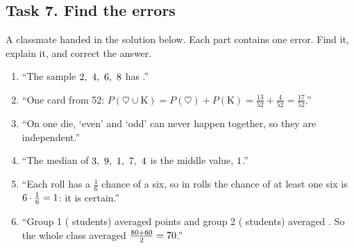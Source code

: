 \subsection*{Task 7. Find the errors}
A classmate handed in the solution below. Each part contains one error. Find it, explain it, and correct the answer.
\begin{enumerate}[label=(\alph*)]
  \item ``The sample $2,\ 4,\ 6,\ 8$ has \hwWrongVar.''
  \item ``One card from 52: $P(\heartsuit \cup \mathrm{K}) = P(\heartsuit) + P(\mathrm{K}) =
        \frac{13}{52} + \frac{4}{52} = \frac{17}{52}$.''
  \item ``On one die, `even' and `odd' can never happen together, so they are independent.''
  \item ``The median of $3,\ 9,\ 1,\ 7,\ 4$ is the middle value, $1$.''
  \item ``Each roll has a $\frac16$ chance of a six, so in \hwErrSixRolls{} rolls the chance of at least one six is
        $6 \cdot \frac16 = 1$: it is certain.''
  \item ``Group 1 (\hwGroupAn{} students) averaged \hwGroupAm{} points and group 2 (\hwGroupBn{} students) averaged
        \hwGroupBm. So the whole class averaged $\frac{80 + 60}{2} = 70$.''
\end{enumerate}

